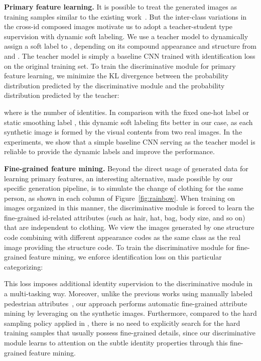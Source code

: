 \documentclass[10pt,twocolumn,letterpaper]{article}
\begin{document}
\textbf{Primary feature learning.} 
It is possible to treat the generated images as training samples similar to the existing work~\cite{zheng2017unlabeled, huang2018multi, qian2017pose}. But the inter-class variations in the cross-id composed images motivate us to adopt a teacher-student type supervision with dynamic soft labeling. We use a teacher model to dynamically assign a soft label to , depending on its compound appearance and structure from  and . The teacher model is simply a baseline CNN trained with identification loss on the original training set. To train the discriminative module for primary feature learning, we minimize the KL divergence between the probability distribution  predicted by the discriminative module and the probability distribution  predicted by the teacher:

where  is the number of identities. In comparison with the fixed one-hot label \cite{qian2017pose,zou2018unsupervised} or static smoothing label \cite{zheng2017unlabeled}, this dynamic soft labeling fits better in our case, as each synthetic image is formed by the visual contents from two real images. In the experiments, we show that a simple baseline CNN serving as the teacher model is reliable to provide the dynamic labels and improve the performance.    

\textbf{Fine-grained feature mining.} 
Beyond the direct usage of generated data for learning primary features, an interesting alternative, made possible by our specific generation pipeline, is to simulate the change of clothing for the same person, as shown in each column of Figure~\ref{fig:rainbow}. When training on images organized in this manner, the discriminative module is forced to learn the fine-grained id-related attributes (such as hair, hat, bag, body size, and so on) that are independent to clothing. We view the images generated by one structure code combining with different appearance codes as the same class as the real image providing the structure code. To train the discriminative module for fine-grained feature mining, we enforce identification loss on this particular categorizing:

This loss imposes additional identity supervision to the discriminative module in a multi-tasking way. Moreover, unlike the previous works using manually labeled pedestrian attributes~\cite{lin2017improving, su2016deep, wang2018transferable}, our approach performs automatic fine-grained attribute mining by leveraging on the synthetic images. 
Furthermore, compared to the hard sampling policy applied in \cite{hermans2017defense, ristani2018features}, there is no need to explicitly search for the hard training samples that usually possess fine-grained details, since our discriminative module learns to attention on the subtle identity properties through this fine-grained feature mining.  
\end{document}
